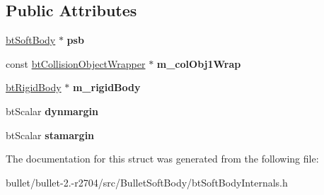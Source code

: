 \subsection*{Public Attributes}
\begin{DoxyCompactItemize}
\item 
\hypertarget{structbt_soft_colliders_1_1_collide_s_d_f___r_s_a5ad3b9d51e7ec617e8dc6bc3c1a7ebf7}{\hyperlink{classbt_soft_body}{bt\+Soft\+Body} $\ast$ {\bfseries psb}}\label{structbt_soft_colliders_1_1_collide_s_d_f___r_s_a5ad3b9d51e7ec617e8dc6bc3c1a7ebf7}

\item 
\hypertarget{structbt_soft_colliders_1_1_collide_s_d_f___r_s_aed21a54c9bf459bea26b8e9d20464d7a}{const \hyperlink{structbt_collision_object_wrapper}{bt\+Collision\+Object\+Wrapper} $\ast$ {\bfseries m\+\_\+col\+Obj1\+Wrap}}\label{structbt_soft_colliders_1_1_collide_s_d_f___r_s_aed21a54c9bf459bea26b8e9d20464d7a}

\item 
\hypertarget{structbt_soft_colliders_1_1_collide_s_d_f___r_s_a54908dbec17b9ca6830c5069cb01f72d}{\hyperlink{classbt_rigid_body}{bt\+Rigid\+Body} $\ast$ {\bfseries m\+\_\+rigid\+Body}}\label{structbt_soft_colliders_1_1_collide_s_d_f___r_s_a54908dbec17b9ca6830c5069cb01f72d}

\item 
\hypertarget{structbt_soft_colliders_1_1_collide_s_d_f___r_s_a097b8ab40b3052df3d381a0189d7953d}{bt\+Scalar {\bfseries dynmargin}}\label{structbt_soft_colliders_1_1_collide_s_d_f___r_s_a097b8ab40b3052df3d381a0189d7953d}

\item 
\hypertarget{structbt_soft_colliders_1_1_collide_s_d_f___r_s_a68a8fc30e5cc12c06e6cab04901a013e}{bt\+Scalar {\bfseries stamargin}}\label{structbt_soft_colliders_1_1_collide_s_d_f___r_s_a68a8fc30e5cc12c06e6cab04901a013e}

\end{DoxyCompactItemize}


The documentation for this struct was generated from the following file\+:\begin{DoxyCompactItemize}
\item 
bullet/bullet-\/2.-\/r2704/src/\+Bullet\+Soft\+Body/bt\+Soft\+Body\+Internals.\+h\end{DoxyCompactItemize}

